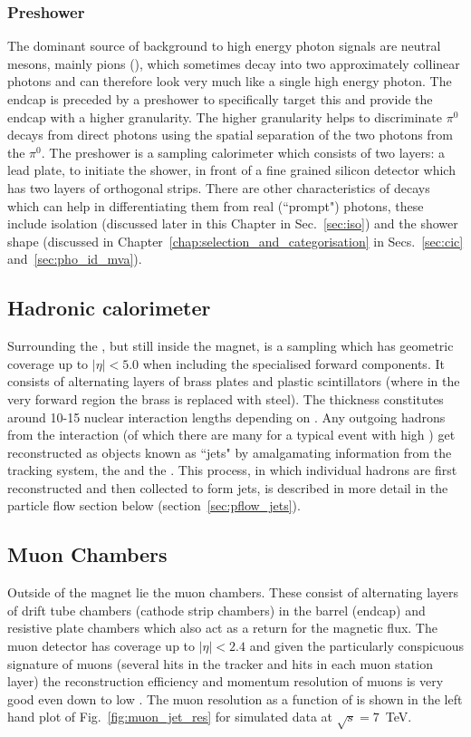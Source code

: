 \subsubsection{Preshower}
The dominant source of background to high energy photon signals are neutral mesons, mainly pions (\pizero), which sometimes decay into two approximately collinear photons and can therefore look very much like a single high energy photon. The \ECAL endcap is preceded by a preshower to specifically target this and provide the endcap with a higher granularity. The higher granularity helps to discriminate $\pi^{0}$ decays from direct photons using the spatial separation of the two photons from the $\pi^{0}$. The preshower is a sampling calorimeter which consists of two layers: a lead plate, to initiate the shower, in front of a fine grained silicon detector which has two layers of orthogonal strips. There are other characteristics of \pizero decays which can help in differentiating them from real (``prompt") photons, these include isolation (discussed later in this Chapter in Sec.~\ref{sec:iso}) and the shower shape (discussed in Chapter~\ref{chap:selection_and_categorisation} in Secs.~\ref{sec:cic} and~\ref{sec:pho_id_mva}).

\subsection{Hadronic calorimeter}
\label{sec:hcal}

Surrounding the \ECAL, but still inside the magnet, is a sampling \HCAL which has geometric coverage up to $|\eta|<5.0$ when including the specialised forward components. It consists of alternating layers of brass plates and plastic scintillators (where in the very forward region the brass is replaced with steel). The \HCAL thickness constitutes around 10-15 nuclear interaction lengths depending on \eta. Any outgoing hadrons from the interaction (of which there are many for a typical event with high \ET) get reconstructed as objects known as ``jets" by amalgamating information from the tracking system, the \ECAL and the \HCAL. This process, in which individual hadrons are first reconstructed and then collected to form jets, is described in more detail in the particle flow section below (section~\ref{sec:pflow_jets}).  

\subsection{Muon Chambers}
\label{sec:muons}
Outside of the magnet lie the \CMS muon chambers. These consist of alternating layers of drift tube chambers (cathode strip chambers) in the barrel (endcap) and resistive plate chambers which also act as a return for the magnetic flux. The muon detector has coverage up to $|\eta|<2.4$ and given the particularly conspicuous signature of muons (several hits in the tracker and hits in each muon station layer) the reconstruction efficiency and momentum resolution of muons is very good even down to low \pT. The muon resolution as a function of \pT is shown in the left hand plot of Fig.~\ref{fig:muon_jet_res} for simulated data at $\sqrt{s}=7$~TeV.

